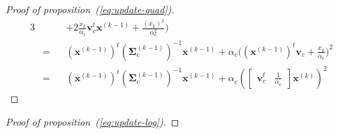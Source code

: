 \documentclass[journal,peerreview,onecolumn]{IEEEtran}
\begin{document}
\begin{proof}[Proof of proposition~(\ref{eq:update-quad})]
\begin{alignat*}{3}
     & &&+ 2 \frac{x_k}{\alpha_c} \mathbf{v}_c^t \mathbf{x}^{(k-1)} + \frac{(x_k)^2}{\alpha_c^2}\Big) \\
     &= &&(\mathbf{x}^{(k-1)})^t (\boldsymbol{\Sigma}_c^{(k-1)})^{-1} \mathbf{x}^{(k-1)} + \alpha_c \Big( (\mathbf{x}^{(k-1)})^t \mathbf{v}_c + \frac{x_k}{\alpha_c} \Big)^2 \\
     &= &&(\mathbf{x}^{(k-1)})^t (\boldsymbol{\Sigma}_c^{(k-1)})^{-1} \mathbf{x}^{(k-1)} + \alpha_c ( \left[\begin{array}{cc} \mathbf{v}_c^t & \frac{1}{\alpha_c} \end{array}\right] \mathbf{x}^{(k)} )^2
    \end{alignat*}
\end{proof}

\begin{proof}[Proof of proposition~(\ref{eq:update-log})]


\end{proof}
\end{document}
